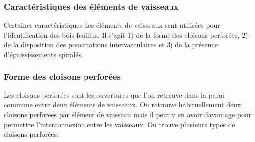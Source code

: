 \subsubsection{Caractéristiques des éléments de vaisseaux}

Certaines caractéristiques des éléments de vaisseaux sont utilisées pour l'identification des bois feuillus.  Il s'agit 1) de la forme des cloisons perforées, 2) de la disposition des ponctuations intervasculaires et 3) de la présence d'épaississements spiralés.

\subsubsection{Forme des cloisons perforées}\label{cloisons}

Les cloisons perforées sont les ouvertures que l'on retrouve dans la paroi commune entre deux éléments de vaisseaux.  On retrouve habituellement deux cloisons perforées par élément de vaisseau mais il peut y en avoir davantage pour permettre l'interconnexion entre les vaisseaux. On trouve plusieurs types de cloisons perforées:

